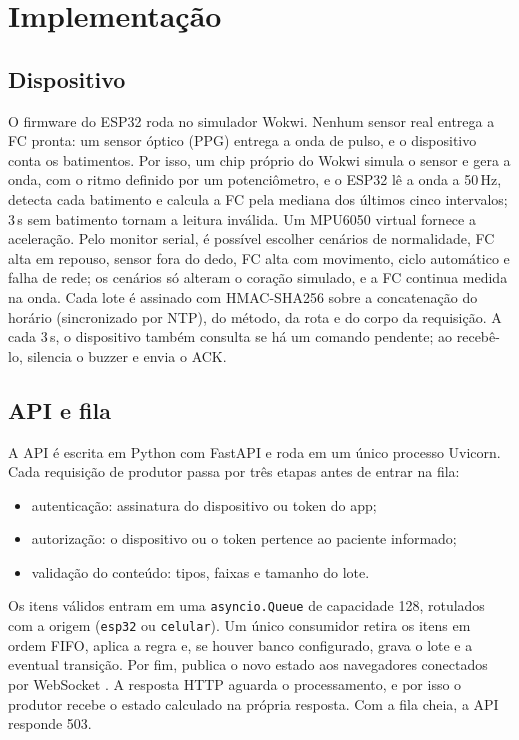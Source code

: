 \documentclass[12pt,a4paper]{article}
\begin{document}
\section{Implementação}\label{sec:impl}

\subsection{Dispositivo}

O firmware do ESP32 roda no simulador Wokwi.
Nenhum sensor real entrega a FC pronta: um sensor óptico (PPG) entrega a onda de pulso, e o dispositivo conta os batimentos.
Por isso, um chip próprio do Wokwi simula o sensor e gera a onda, com o ritmo definido por um potenciômetro, e o ESP32 lê a onda a 50\,Hz, detecta cada batimento e calcula a FC pela mediana dos últimos cinco intervalos; 3\,s sem batimento tornam a leitura inválida.
Um MPU6050 virtual fornece a aceleração.
Pelo monitor serial, é possível escolher cenários de normalidade, FC alta em repouso, sensor fora do dedo, FC alta com movimento, ciclo automático e falha de rede; os cenários só alteram o coração simulado, e a FC continua medida na onda.
Cada lote é assinado com HMAC-SHA256 sobre a concatenação do horário (sincronizado por NTP), do método, da rota e do corpo da requisição.
A cada 3\,s, o dispositivo também consulta se há um comando pendente; ao recebê-lo, silencia o buzzer e envia o ACK.

\subsection{API e fila}

A API é escrita em Python com FastAPI e roda em um único processo Uvicorn.
Cada requisição de produtor passa por três etapas antes de entrar na fila:
\begin{itemize}
  \item autenticação: assinatura do dispositivo ou token do app;
  \item autorização: o dispositivo ou o token pertence ao paciente informado;
  \item validação do conteúdo: tipos, faixas e tamanho do lote.
\end{itemize}
Os itens válidos entram em uma \texttt{asyncio.Queue} de capacidade 128, rotulados com a origem (\texttt{esp32} ou \texttt{celular}).
Um único consumidor retira os itens em ordem FIFO, aplica a regra e, se houver banco configurado, grava o lote e a eventual transição.
Por fim, publica o novo estado aos navegadores conectados por WebSocket \cite{rfc6455}.
A resposta HTTP aguarda o processamento, e por isso o produtor recebe o estado calculado na própria resposta.
Com a fila cheia, a API responde 503.
\end{document}
